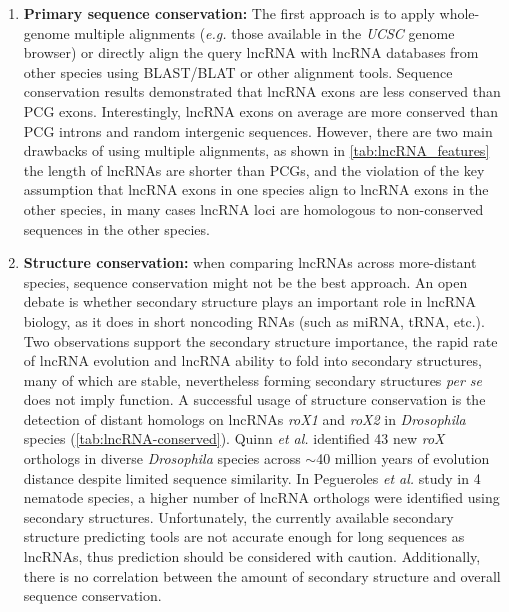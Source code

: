 \begin{enumerate}
\item \textbf{Primary sequence conservation:} The first approach is to apply whole-genome multiple alignments (\textit{e.g.} those available in the \textit{UCSC} genome browser) or directly align the query lncRNA with lncRNA databases from other species using BLAST/BLAT or other alignment tools. Sequence conservation results demonstrated that lncRNA exons are less conserved than PCG exons.\autocite{necsulea_2014_evolution,haerty_2013_mutations} Interestingly, lncRNA exons on average are more conserved than PCG introns and random intergenic sequences.\autocite{cabili_2011_integrative,marques_2009_catalogues} However, there are two main drawbacks of using multiple alignments, as shown in \autoref{tab:lncRNA_features} the length of lncRNAs are shorter than PCGs, and the violation of the key assumption that lncRNA exons in one species align to lncRNA exons in the other species, in many cases lncRNA loci are homologous to non-conserved sequences in the other species.\autocite{necsulea_2014_evolution,washietl_2014_evolutionary}
  
\item \textbf{Structure conservation:} when comparing lncRNAs across more-distant species, sequence conservation might not be the best approach. An open debate is whether secondary structure plays an important role in lncRNA biology, as it does in short noncoding RNAs\autocite{ulitsky_2018_interactions} (such as miRNA, tRNA, etc.). Two observations support the secondary structure importance, the rapid rate of lncRNA evolution and lncRNA ability to fold into secondary structures, many of which are stable, nevertheless forming secondary structures \textit{per se} does not imply function. A successful usage of structure conservation is the detection of distant homologs on lncRNAs \textit{roX1} and \textit{roX2} in \textit{Drosophila} species\autocite{quinn_2016_rapid} (\autoref{tab:lncRNA-conserved}). Quinn \textit{et al.} identified 43 new \textit{roX} orthologs in diverse \textit{Drosophila} species across $\sim$40 million years of evolution distance despite limited sequence similarity. In Pegueroles \textit{et al.} study in 4  nematode species, a higher number of lncRNA orthologs were identified using secondary structures.\autocite{pegueroles_2019_synteny} Unfortunately, the currently available secondary structure predicting tools are not accurate enough for long sequences as lncRNAs,\autocite{novikova_2013_3s} thus prediction should be considered with caution. Additionally, there is no correlation between the amount of secondary structure and overall sequence conservation.\autocite{managadze_2011_negative, yang_2015_human}


\end{enumerate}
